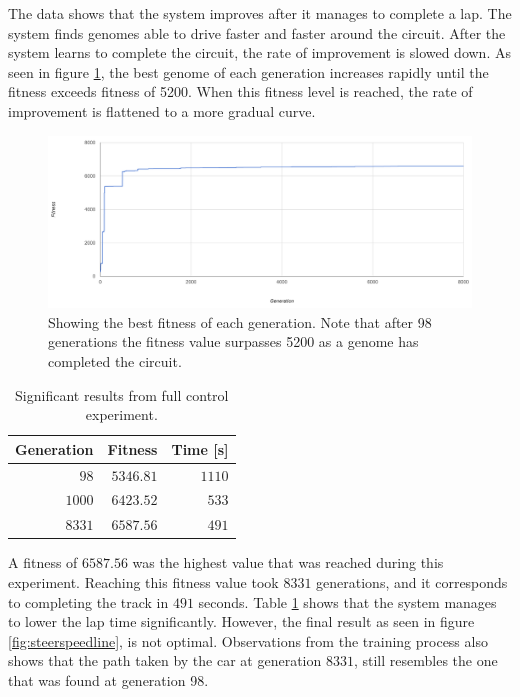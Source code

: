 The data shows that the system improves after it manages to complete a lap. The system finds genomes able to drive faster and faster around the circuit. After the system learns to complete the circuit, the rate of improvement is slowed down. As seen in figure \ref{fig:steerspeeddata}, the best genome of each generation increases rapidly until the fitness exceeds fitness of 5200. When this fitness level is reached, the rate of improvement is flattened to a more gradual curve. 

\begin{figure}[h]
\includegraphics[width=\textwidth]{report/images/graphs/steeringandspeedcontrolrun1}
\centering
\caption{Showing the best fitness of each generation. Note that after 98 generations the fitness value surpasses 5200 as a genome has completed the circuit.}
\label{fig:steerspeeddata}
\end{figure}

\begin{table}[h!] 
  \centering
  \begin{tabular}{rrr}
    \toprule
    Generation & Fitness & Time [s]\\
    \midrule
    $98$ & $5346.81$ & $1110$ \\
    $1000$ & $6423.52$ & $533$ \\
    $8331$ & $6587.56$ & $491$  \\
    \bottomrule
  \end{tabular}
  \caption{Significant results from full control experiment.}
  \label{tab:fullcontrol}
\end{table}

A fitness of $6587.56$ was the highest value that was reached during this experiment. Reaching this fitness value took $8331$ generations, and it corresponds to completing the track in $491$ seconds. Table \ref{tab:fullcontrol} shows that the system manages to lower the lap time significantly. However, the final result as seen in figure \ref{fig:steerspeedline}, is not optimal. Observations from the training process also shows that the path taken by the car at generation $8331$, still resembles the one that was found at generation 98.

